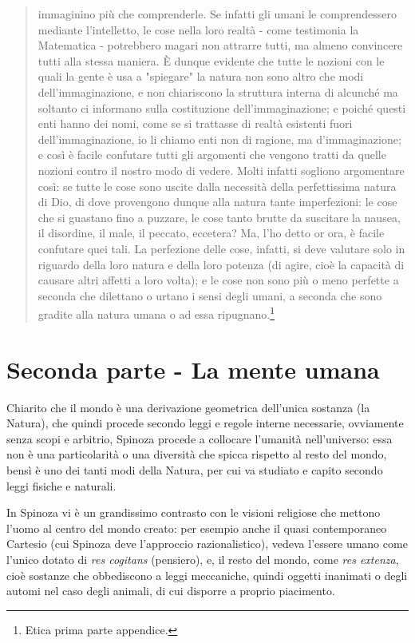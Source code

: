 \begin{quotation}
	immaginino più che comprenderle. Se infatti gli umani le comprendessero mediante l’intelletto, le cose nella loro realtà - come testimonia la Matematica - potrebbero magari non
	attrarre tutti, ma almeno convincere tutti alla stessa maniera.
	È dunque evidente che tutte le nozioni con le quali la gente è usa a "spiegare" la natura
	non sono altro che modi dell’immaginazione, e non chiariscono la struttura interna di alcunché ma soltanto ci informano sulla costituzione dell’immaginazione; e poiché questi enti hanno dei nomi, come se si trattasse di realtà esistenti fuori dell’immaginazione, io li chiamo enti non di ragione, ma d’immaginazione; e così è facile confutare tutti gli argomenti che vengono tratti da quelle nozioni contro il nostro modo di vedere. Molti infatti sogliono argomentare così: se tutte le cose sono uscite dalla necessità della perfettissima natura di Dio, di dove provengono dunque alla natura tante imperfezioni: le cose che si guastano fino a puzzare, le cose tanto brutte da suscitare la nausea, il disordine, il male, il peccato, eccetera? Ma, l’ho detto or ora, è facile confutare quei tali. La perfezione delle cose,
	infatti, si deve valutare solo in riguardo della loro natura e della loro potenza (di agire, cioè la capacità  di causare altri affetti a loro volta); e le cose non
	sono più o meno perfette a seconda che dilettano o urtano i sensi degli umani, a seconda
	che sono gradite alla natura umana o ad essa ripugnano.\footnote{Etica prima parte appendice.}
	
\end{quotation}
\newpage
\section{Seconda parte - La mente umana}
Chiarito che il mondo è una derivazione geometrica dell'unica sostanza (la Natura), che quindi procede secondo leggi e regole interne necessarie, ovviamente senza scopi e arbitrio, Spinoza procede a collocare l'umanità nell'universo: essa non è una particolarità o una diversità che spicca rispetto al resto del mondo, bensì è uno dei tanti modi della Natura, per cui va studiato e capito secondo leggi fisiche e naturali.

In Spinoza vi è un grandissimo contrasto con le visioni religiose che mettono l'uomo al centro del mondo creato: per esempio anche il quasi contemporaneo Cartesio (cui Spinoza deve l'approccio razionalistico), vedeva l'essere umano come l'unico dotato di \textit{res cogitans} (pensiero), e, il resto del mondo, come \textit{res extenza}, cioè sostanze che obbediscono a leggi meccaniche, quindi oggetti inanimati o degli automi nel caso degli animali, di cui disporre a proprio piacimento.

